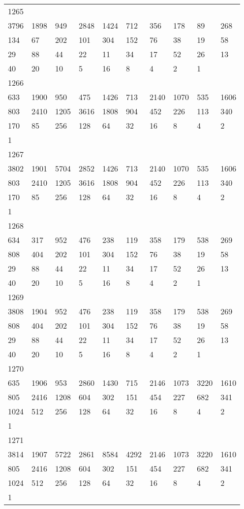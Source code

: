 \begin{longtable}{*{10}{l}}
1265&&&&&&&&&\\
3796& 1898& 949& 2848& 1424& 712& 356& 178& 89& 268\\
134& 67& 202& 101& 304& 152& 76& 38& 19& 58\\
29& 88& 44& 22& 11& 34& 17& 52& 26& 13\\
40& 20& 10& 5& 16& 8& 4& 2& 1& \\

1266&&&&&&&&&\\
633& 1900& 950& 475& 1426& 713& 2140& 1070& 535& 1606\\
803& 2410& 1205& 3616& 1808& 904& 452& 226& 113& 340\\
170& 85& 256& 128& 64& 32& 16& 8& 4& 2\\
1& \\

1267&&&&&&&&&\\
3802& 1901& 5704& 2852& 1426& 713& 2140& 1070& 535& 1606\\
803& 2410& 1205& 3616& 1808& 904& 452& 226& 113& 340\\
170& 85& 256& 128& 64& 32& 16& 8& 4& 2\\
1& \\

1268&&&&&&&&&\\
634& 317& 952& 476& 238& 119& 358& 179& 538& 269\\
808& 404& 202& 101& 304& 152& 76& 38& 19& 58\\
29& 88& 44& 22& 11& 34& 17& 52& 26& 13\\
40& 20& 10& 5& 16& 8& 4& 2& 1& \\

1269&&&&&&&&&\\
3808& 1904& 952& 476& 238& 119& 358& 179& 538& 269\\
808& 404& 202& 101& 304& 152& 76& 38& 19& 58\\
29& 88& 44& 22& 11& 34& 17& 52& 26& 13\\
40& 20& 10& 5& 16& 8& 4& 2& 1& \\

1270&&&&&&&&&\\
635& 1906& 953& 2860& 1430& 715& 2146& 1073& 3220& 1610\\
805& 2416& 1208& 604& 302& 151& 454& 227& 682& 341\\
1024& 512& 256& 128& 64& 32& 16& 8& 4& 2\\
1& \\

1271&&&&&&&&&\\
3814& 1907& 5722& 2861& 8584& 4292& 2146& 1073& 3220& 1610\\
805& 2416& 1208& 604& 302& 151& 454& 227& 682& 341\\
1024& 512& 256& 128& 64& 32& 16& 8& 4& 2\\
1& \\


\end{longtable}
